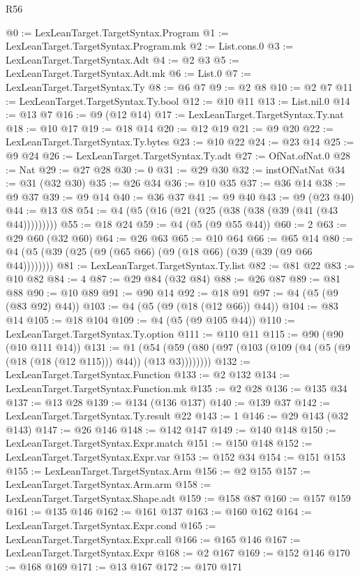 \begin{lexlean}{R56}
\begin{coremodule}
@0 := LexLeanTarget.TargetSyntax.Program
@1 := LexLeanTarget.TargetSyntax.Program.mk
@2 := List.cons.{0}
@3 := LexLeanTarget.TargetSyntax.Adt
@4 := @2 @3
@5 := LexLeanTarget.TargetSyntax.Adt.mk
@6 := List.{0}
@7 := LexLeanTarget.TargetSyntax.Ty
@8 := @6 @7
@9 := @2 @8
@10 := @2 @7
@11 := LexLeanTarget.TargetSyntax.Ty.bool
@12 := @10 @11
@13 := List.nil.{0}
@14 := @13 @7
@16 := @9 (@12 @14)
@17 := LexLeanTarget.TargetSyntax.Ty.nat
@18 := @10 @17
@19 := @18 @14
@20 := @12 @19
@21 := @9 @20
@22 := LexLeanTarget.TargetSyntax.Ty.bytes
@23 := @10 @22
@24 := @23 @14
@25 := @9 @24
@26 := LexLeanTarget.TargetSyntax.Ty.adt
@27 := OfNat.ofNat.{0}
@28 := Nat
@29 := @27 @28
@30 := 0
@31 := @29 @30
@32 := instOfNatNat
@34 := @31 (@32 @30)
@35 := @26 @34
@36 := @10 @35
@37 := @36 @14
@38 := @9 @37
@39 := @9 @14
@40 := @36 @37
@41 := @9 @40
@43 := @9 (@23 @40)
@44 := @13 @8
@54 := @4 (@5 (@16 (@21 (@25 (@38 (@38 (@39 (@41 (@43 @44)))))))))
@55 := @18 @24
@59 := @4 (@5 (@9 @55 @44))
@60 := 2
@63 := @29 @60 (@32 @60)
@64 := @26 @63
@65 := @10 @64
@66 := @65 @14
@80 := @4 (@5 (@39 (@25 (@9 (@65 @66) (@9 (@18 @66) (@39 (@39 (@9 @66 @44))))))))
@81 := LexLeanTarget.TargetSyntax.Ty.list
@82 := @81 @22
@83 := @10 @82
@84 := 4
@87 := @29 @84 (@32 @84)
@88 := @26 @87
@89 := @81 @88
@90 := @10 @89
@91 := @90 @14
@92 := @18 @91
@97 := @4 (@5 (@9 (@83 @92) @44))
@103 := @4 (@5 (@9 (@18 (@12 @66)) @44))
@104 := @83 @14
@105 := @18 @104
@109 := @4 (@5 (@9 @105 @44))
@110 := LexLeanTarget.TargetSyntax.Ty.option
@111 := @110 @11
@115 := @90 (@90 (@10 @111 @14))
@131 := @1 (@54 (@59 (@80 (@97 (@103 (@109 (@4 (@5 (@9 (@18 (@18 (@12 @115))) @44)) (@13 @3))))))))
@132 := LexLeanTarget.TargetSyntax.Function
@133 := @2 @132
@134 := LexLeanTarget.TargetSyntax.Function.mk
@135 := @2 @28
@136 := @135 @34
@137 := @13 @28
@139 := @134 (@136 @137)
@140 := @139 @37
@142 := LexLeanTarget.TargetSyntax.Ty.result @22
@143 := 1
@146 := @29 @143 (@32 @143)
@147 := @26 @146
@148 := @142 @147
@149 := @140 @148
@150 := LexLeanTarget.TargetSyntax.Expr.match
@151 := @150 @148
@152 := LexLeanTarget.TargetSyntax.Expr.var
@153 := @152 @34
@154 := @151 @153
@155 := LexLeanTarget.TargetSyntax.Arm
@156 := @2 @155
@157 := LexLeanTarget.TargetSyntax.Arm.arm
@158 := LexLeanTarget.TargetSyntax.Shape.adt
@159 := @158 @87
@160 := @157 @159
@161 := @135 @146
@162 := @161 @137
@163 := @160 @162
@164 := LexLeanTarget.TargetSyntax.Expr.cond
@165 := LexLeanTarget.TargetSyntax.Expr.call
@166 := @165 @146
@167 := LexLeanTarget.TargetSyntax.Expr
@168 := @2 @167
@169 := @152 @146
@170 := @168 @169
@171 := @13 @167
@172 := @170 @171

\end{coremodule}
\end{lexlean}
